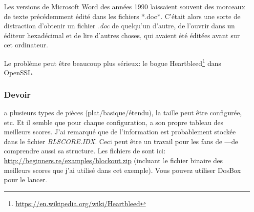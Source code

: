 Les versions de Microsoft Word des années 1990 laissaient souvent des morceaux de
texte précédemment édité dans les fichiers *.doc*.
C'était alors une sorte de distraction d'obtenir un fichier \emph{.doc} de quelqu'un
d'autre, de l'ouvrir dans un éditeur hexadécimal et de lire d'autres choses, qui
avaient été éditées avant sur cet ordinateur.

Le problème peut être beaucoup plus sérieux: le bogue Heartbleed\footnote{\url{https://en.wikipedia.org/wiki/Heartbleed}}
dans OpenSSL.

\subsubsection{Devoir}

 a plusieurs types de pièces (plat/basique/étendu), la taille peut être configurée, etc.
Et il semble que pour chaque configuration,  a son propre tableau des
meilleurs scores.
J'ai remarqué que de l'information est probablement stockée dans le fichier \emph{BLSCORE.IDX}.
Ceci peut être un travail pour les fans de ---de comprendre aussi sa
structure.
Les fichiers de  sont ici: \url{http://beginners.re/examples/blockout.zip}
(incluant le fichier binaire des meilleurs scores que j'ai utilisé dans cet exemple).
Vous pouvez utiliser DosBox pour le lancer.

